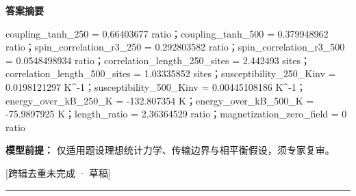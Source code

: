 \documentclass[UTF8,11pt,a4paper]{ctexart}
\begin{document}
\noindent\textbf{答案摘要}\par
coupling\_tanh\_250 = 0.66403677 ratio；coupling\_tanh\_500 = 0.379948962 ratio；spin\_correlation\_r3\_250 = 0.292803582 ratio；spin\_correlation\_r3\_500 = 0.0548498934 ratio；correlation\_length\_250\_sites = 2.442493 sites；correlation\_length\_500\_sites = 1.03335852 sites；susceptibility\_250\_Kinv = 0.0198121297 K\textasciicircum{}-1；susceptibility\_500\_Kinv = 0.00445108186 K\textasciicircum{}-1；energy\_over\_kB\_250\_K = -132.807354 K；energy\_over\_kB\_500\_K = -75.9897925 K；length\_ratio = 2.36364529 ratio；magnetization\_zero\_field = 0 ratio\par
\noindent\textbf{模型前提：}
仅适用题设理想统计力学、传输边界与相平衡假设，须专家复审。\par
\noindent\textcolor{red!65!black}{[跨辑去重未完成 · 草稿]} \par
\medskip\hrule\medskip
{}
\end{document}
